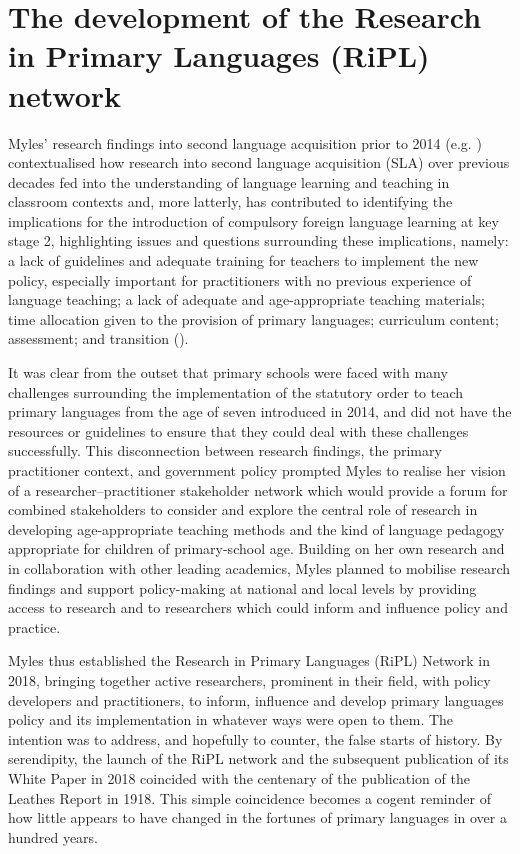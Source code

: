 \documentclass[output=paper]{langscibook}
\begin{document}
\begin{sloppypar}
\end{sloppypar}

\section{The development of the Research in Primary Languages (RiPL) network}

Myles’ research findings into second language acquisition prior to 2014 (e.g. \citealt{Myles2014}) contextualised how research into second language acquisition (SLA) over previous decades fed into the understanding of language learning and teaching in classroom contexts and, more latterly, has contributed to identifying the implications for the introduction of compulsory foreign language learning at key stage 2, highlighting issues and questions surrounding these implications, namely: a lack of guidelines and adequate training for teachers to implement the new policy, especially important for practitioners with no previous experience of language teaching; a lack of adequate and age-appropriate teaching materials; time allocation given to the provision of primary languages; curriculum content; assessment; and transition (\citealt{HolmesMyles2019}).

It was clear from the outset that primary schools were faced with many challenges surrounding the implementation of the statutory order to teach primary languages from the age of seven introduced in 2014, and did not have the resources or guidelines to ensure that they could deal with these challenges successfully. This disconnection between research findings, the primary practitioner context, and government policy prompted Myles to realise her vision of a re\-searcher--prac\-ti\-tion\-er stakeholder network which would provide a forum for combined stakeholders to consider and explore the central role of research in developing age-appropriate teaching methods and the kind of language pedagogy appropriate for children of primary-school age. Building on her own research and in collaboration with other leading academics, Myles planned to mobilise research findings and support policy-making at national and local levels by providing access to research and to researchers which could inform and influence policy and practice. 

Myles thus established the Research in Primary Languages (RiPL) Network in 2018, bringing together active researchers, prominent in their field, with policy developers and practitioners, to inform, influence and develop primary languages policy and its implementation in whatever ways were open to them. The intention was to address, and hopefully to counter, the false starts of history. By serendipity, the launch of the RiPL network and the subsequent publication of its White Paper in 2018 coincided with the centenary of the publication of the Leathes Report in 1918. This simple coincidence becomes a cogent reminder of how little appears to have changed in the fortunes of primary languages in over a hundred years.
\end{document}
